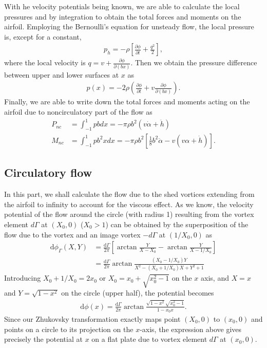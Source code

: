 With he velocity potentials being known, we are able to calculate the local pressures and by integration to obtain the total forces and moments on the airfoil.
Employing the Bernoulli's equation for unsteady flow, the local pressure is, except for a constant,
\begin{align}
p_h = -\rho[\frac{\partial \phi}{\partial t} + \frac{q^2}{2}],
\end{align} 
where the local velocity is $q = v+\frac{\partial \phi}{\partial (bx)}$. Then we obtain the pressure difference between upper and lower surfaces at $x$ as
\begin{align}
p(x) = -2\rho(\frac{\partial \phi}{\partial t} + v\frac{\partial \phi}{\partial (bx)}).
\end{align} 
Finally, we are able to write down the total forces and moments acting on the airfoil due to noncirculatory part of the flow as
\begin{align}
P_{nc} & = \int^{1}_{-1}pbdx
   = -\pi\rho b^2(v\dot{\alpha} + \ddot{h})   \\
M_{nc} & = \int^{1}_{-1}pb^2xdx
   = -\pi\rho b^2[\frac{1}{8}b^2\ddot{\alpha}-v(v\alpha + \dot{h})].
\end{align}


\subsection{Circulatory flow}

In this part, we shall calculate the flow due to the shed vortices extending from the airfoil to infinity to account for the viscous effect.
As we know, the velocity potential of the flow around the circle (with radius 1) resulting from the vortex element $d\Gamma$ at $(X_0, 0)$ ($X_0 > 1$) can be obtained by the superposition of the flow due to the vortex and an image vortex $-d\Gamma$ at $(1/X_0,0)$ as
\begin{align}
\mathrm{d}\phi_\Gamma (X,Y) & = \frac{\mathrm{d}\Gamma}{2\pi}[\arctan \frac{Y}{X-X_0} - \arctan \frac{Y}{X-1/X_0}]  \\
            & =  \frac{\mathrm{d}\Gamma}{2\pi}\arctan \frac{(X_0-1/X_0)Y}{X^2-(X_0+1/X_0)X+Y^2+1}
\end{align}
Introducing $X_0 + 1/X_0 = 2x_0$ or $X_0 = x_0 + \sqrt{x_0^2-1}$ on the $x$ axis, and $X=x$ and $Y=\sqrt{1-x^2}$ on the circle (upper half), the potential becomes
\begin{align}
\mathrm{d}\phi (x) = \frac{\mathrm{d}\Gamma}{2\pi} \arctan \frac{\sqrt{1-x^2}\sqrt{x_0^2-1}}{1-x_0x}.
\end{align}
Since our Zhukovsky transformation exactly maps point $(X_0, 0)$ to $(x_0, 0)$ and points on a circle to its projection on the $x$-axis, the expression above gives precisely the potential at $x$ on a flat plate due to vortex element $d\Gamma$ at $(x_0, 0)$.

